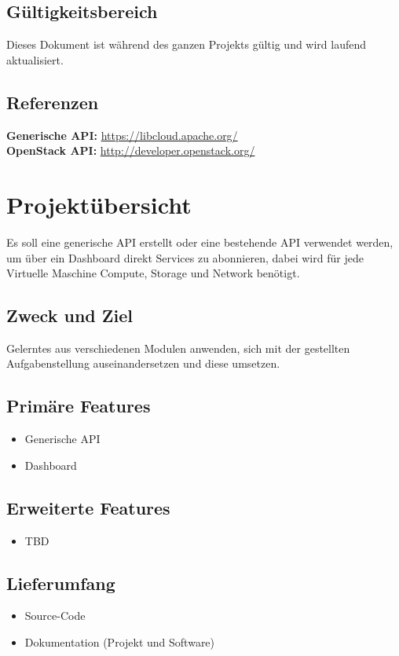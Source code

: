 \documentclass[11pt]{scrartcl}
\begin{document}
\subsection{Gültigkeitsbereich}
Dieses Dokument ist während des ganzen Projekts gültig und wird laufend aktualisiert.

\subsection{Referenzen}
\textbf{Generische API:} 
\href{https://libcloud.apache.org/}{https://libcloud.apache.org/}\\
\textbf{OpenStack API:} \href{http://developer.openstack.org/}{http://developer.openstack.org/}
\section{Projektübersicht}
Es soll eine generische API erstellt oder eine bestehende API verwendet werden, um über ein 
Dashboard direkt Services zu abonnieren, dabei wird für jede Virtuelle Maschine 
Compute, Storage und Network benötigt.

\subsection{Zweck und Ziel}
 Gelerntes aus verschiedenen Modulen anwenden, sich mit der gestellten Aufgabenstellung auseinandersetzen 
 und diese umsetzen.


\subsection{Primäre Features}
\begin{itemize}
  \item Generische API
  \item Dashboard
\end{itemize}
\subsection{Erweiterte Features}
\begin{itemize}
  \item TBD
\end{itemize}
\subsection{Lieferumfang}
\begin{itemize}
  \item Source-Code
  \item Dokumentation (Projekt und Software)
\end{itemize}
\end{document}
